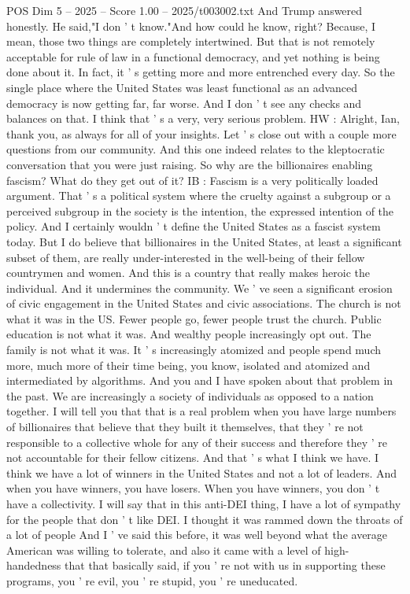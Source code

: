 \begin{textsample}{POS Dim 5 – 2025 – Score 1.00 – 2025/t003002.txt}
And Trump answered honestly.
He said,"I don ' t know."And how could he know, right?
Because, I mean, those two things are completely intertwined.
But that is not remotely acceptable for rule of law in a functional democracy, and yet nothing is being done about it.
In fact, it ' s getting more and more entrenched every day.
So the single place where the United States was least functional as an advanced democracy is now getting far, far worse.
And I don ' t see any checks and balances on that.
I think that ' s a very, very serious problem.
HW : Alright, Ian, thank you, as always for all of your insights.
Let ' s close out with a couple more questions from our community.
And this one indeed relates to the kleptocratic conversation that you were just raising.
So why are the billionaires enabling fascism?
What do they get out of it?
IB : Fascism is a very politically loaded argument.
That ' s a political system where the cruelty against a subgroup or a perceived subgroup in the society is the intention, the expressed intention of the policy.
And I certainly wouldn ' t define the United States as a fascist system today.
But I do believe that billionaires in the United States, at least a significant subset of them, are really under-interested in the well-being of their fellow countrymen and women.
And this is a country that really makes heroic the individual.
And it undermines the community.
We ' ve seen a significant erosion of civic engagement in the United States and civic associations.
The church is not what it was in the US.
Fewer people go, fewer people trust the church.
Public education is not what it was.
And wealthy people increasingly opt out.
The family is not what it was.
It ' s increasingly atomized and people spend much more, much more of their time being, you know, isolated and atomized and intermediated by algorithms.
And you and I have spoken about that problem in the past.
We are increasingly a society of individuals as opposed to a nation together.
I will tell you that that is a real problem when you have large numbers of billionaires that believe that they built it themselves, that they ' re not responsible to a collective whole for any of their success and therefore they ' re not accountable for their fellow citizens.
And that ' s what I think we have.
I think we have a lot of winners in the United States and not a lot of leaders.
And when you have winners, you have losers.
When you have winners, you don ' t have a collectivity.
I will say that in this anti-DEI thing, I have a lot of sympathy for the people that don ' t like DEI.
I thought it was rammed down the throats of a lot of people And I ' ve said this before, it was well beyond what the average American was willing to tolerate, and also it came with a level of high-handedness that that basically said, if you ' re not with us in supporting these programs, you ' re evil, you ' re stupid, you ' re uneducated.

\end{textsample}
